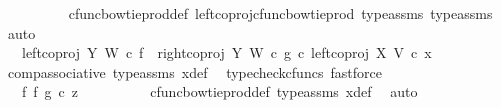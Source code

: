 \begin{isabellebody}
\ \ \ \ \ \ \ \ \isamarkupfalse%
\ cfunc{\isacharunderscore}{\kern0pt}bowtie{\isacharunderscore}{\kern0pt}prod{\isacharunderscore}{\kern0pt}def{}\ left{\isacharunderscore}{\kern0pt}coproj{\isacharunderscore}{\kern0pt}cfunc{\isacharunderscore}{\kern0pt}bowtie{\isacharunderscore}{\kern0pt}prod\ type{\isacharunderscore}{\kern0pt}assms{\isacharparenleft}{\kern0pt}{}{\isacharparenright}{\kern0pt}\ type{\isacharunderscore}{\kern0pt}assms{\isacharparenleft}{\kern0pt}{}{\isacharparenright}{\kern0pt}\ \isamarkupfalse%
\ auto\isanewline
\ \ \ \ \ \ \isamarkupfalse%
\ \isamarkupfalse%
\ {\isachardoublequoteopen}{\isachardot}{\kern0pt}{\isachardot}{\kern0pt}{\isachardot}{\kern0pt}\ {\isacharequal}{\kern0pt}\ {\isacharparenleft}{\kern0pt}{\isacharparenleft}{\kern0pt}left{\isacharunderscore}{\kern0pt}coproj\ Y\ W\ {\isasymcirc}\isactrlsub c\ f{\isacharparenright}{\kern0pt}\ {\isasymamalg}\ {\isacharparenleft}{\kern0pt}right{\isacharunderscore}{\kern0pt}coproj\ Y\ W\ {\isasymcirc}\isactrlsub c\ g{\isacharparenright}{\kern0pt}{\isacharparenright}{\kern0pt}\ {\isasymcirc}\isactrlsub c\ left{\isacharunderscore}{\kern0pt}coproj\ X\ V\ {\isasymcirc}\isactrlsub c\ x{}{\isachardoublequoteclose}\isanewline
\ \ \ \ \ \ \ \ \isamarkupfalse%
\ comp{\isacharunderscore}{\kern0pt}associative{}\ type{\isacharunderscore}{\kern0pt}assms{\isacharparenleft}{\kern0pt}{}{\isacharcomma}{\kern0pt}{}{\isacharparenright}{\kern0pt}\ x{}{\isacharunderscore}{\kern0pt}def\ \isamarkupfalse%
\ {\isacharparenleft}{\kern0pt}typecheck{\isacharunderscore}{\kern0pt}cfuncs{\isacharcomma}{\kern0pt}\ fastforce{\isacharparenright}{\kern0pt}\isanewline
\ \ \ \ \ \ \isamarkupfalse%
\ \isamarkupfalse%
\ {\isachardoublequoteopen}{\isachardot}{\kern0pt}{\isachardot}{\kern0pt}{\isachardot}{\kern0pt}\ {\isacharequal}{\kern0pt}\ {\isacharparenleft}{\kern0pt}f\ {\isasymbowtie}\isactrlsub f\ g{\isacharparenright}{\kern0pt}\ {\isasymcirc}\isactrlsub c\ z{}{\isachardoublequoteclose}\isanewline
\ \ \ \ \ \ \ \ \isamarkupfalse%
\ cfunc{\isacharunderscore}{\kern0pt}bowtie{\isacharunderscore}{\kern0pt}prod{\isacharunderscore}{\kern0pt}def{}\ type{\isacharunderscore}{\kern0pt}assms\ x{}{\isacharunderscore}{\kern0pt}def\ \isamarkupfalse%
\ auto\isanewline
\ \ \ \ \ \ \isamarkupfalse%
\ \isamarkupfalse%

\end{isabellebody}
